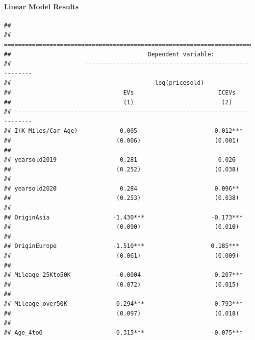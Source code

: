 \documentclass{article}
\begin{document}
\hypertarget{linear-model-results}{%
\paragraph{Linear Model Results}\label{linear-model-results}}

\begin{verbatim}
## 
## ===========================================================================
##                                       Dependent variable:                  
##                     -------------------------------------------------------
##                                         log(pricesold)                     
##                                EVs                        ICEVs            
##                                (1)                         (2)             
## ---------------------------------------------------------------------------
## I(K_Miles/Car_Age)            0.005                     -0.012***          
##                              (0.006)                     (0.001)           
##                                                                            
## yearsold2019                  0.281                       0.026            
##                              (0.252)                     (0.038)           
##                                                                            
## yearsold2020                  0.284                      0.096**           
##                              (0.253)                     (0.038)           
##                                                                            
## OriginAsia                  -1.430***                   -0.173***          
##                              (0.090)                     (0.010)           
##                                                                            
## OriginEurope                -1.510***                   0.185***           
##                              (0.061)                     (0.009)           
##                                                                            
## Mileage_25Kto50K             -0.0004                    -0.207***          
##                              (0.072)                     (0.015)           
##                                                                            
## Mileage_over50K             -0.294***                   -0.793***          
##                              (0.097)                     (0.018)           
##                                                                            
## Age_4to6                    -0.315***                   -0.075***          

\end{verbatim}
\end{document}
